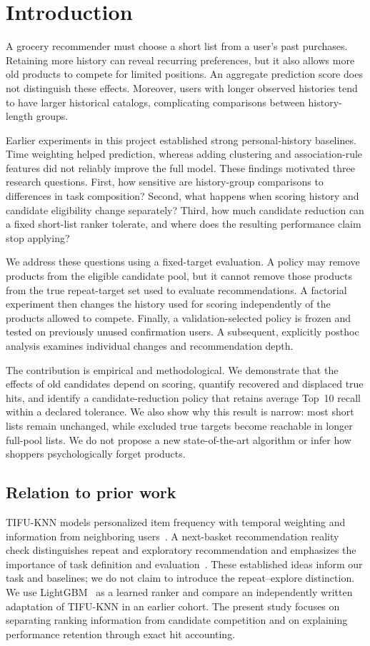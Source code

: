 \section{Introduction}
\label{sec:intro}

A grocery recommender must choose a short list from a user's past purchases. Retaining more history can reveal recurring preferences, but it also allows more old products to compete for limited positions. An aggregate prediction score does not distinguish these effects. Moreover, users with longer observed histories tend to have larger historical catalogs, complicating comparisons between history-length groups.

Earlier experiments in this project established strong personal-history baselines. Time weighting helped prediction, whereas adding clustering and association-rule features did not reliably improve the full model. These findings motivated three research questions. First, how sensitive are history-group comparisons to differences in task composition? Second, what happens when scoring history and candidate eligibility change separately? Third, how much candidate reduction can a fixed short-list ranker tolerate, and where does the resulting performance claim stop applying?

We address these questions using a fixed-target evaluation. A policy may remove products from the eligible candidate pool, but it cannot remove those products from the true repeat-target set used to evaluate recommendations. A factorial experiment then changes the history used for scoring independently of the products allowed to compete. Finally, a validation-selected policy is frozen and tested on previously unused confirmation users. A subsequent, explicitly posthoc analysis examines individual changes and recommendation depth.

The contribution is empirical and methodological. We demonstrate that the effects of old candidates depend on scoring, quantify recovered and displaced true hits, and identify a candidate-reduction policy that retains average Top~10 recall within a declared tolerance. We also show why this result is narrow: most short lists remain unchanged, while excluded true targets become reachable in longer full-pool lists. We do not propose a new state-of-the-art algorithm or infer how shoppers psychologically forget products.

\subsection{Relation to prior work}
TIFU-KNN models personalized item frequency with temporal weighting and information from neighboring users~\citep{hu2020}. A next-basket recommendation reality check distinguishes repeat and exploratory recommendation and emphasizes the importance of task definition and evaluation~\citep{li2023}. These established ideas inform our task and baselines; we do not claim to introduce the repeat--explore distinction. We use LightGBM~\citep{ke2017} as a learned ranker and compare an independently written adaptation of TIFU-KNN in an earlier cohort. The present study focuses on separating ranking information from candidate competition and on explaining performance retention through exact hit accounting.
